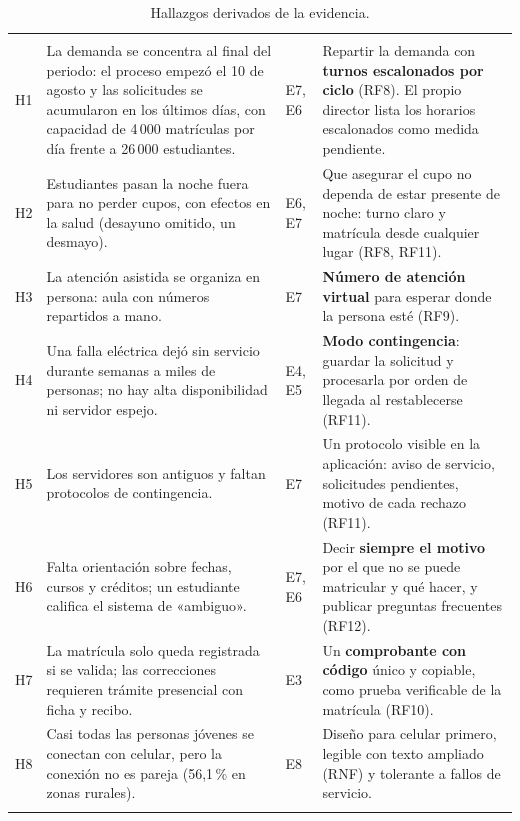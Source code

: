 \begin{longtable}{|p{0.8cm}|p{6.0cm}|p{1.4cm}|p{5.6cm}|}
	\hline
	\cab\hd{ID} & \hd{Hallazgo} & \hd{Evidencia} & \hd{Implicancia para MatrLab}\\
	\hline\endfirsthead
	\hline
	\cab\hd{ID} & \hd{Hallazgo} & \hd{Evidencia} & \hd{Implicancia para MatrLab}\\
	\hline\endhead
	H1 & La demanda se concentra al final del periodo: el proceso empezó el 10 de agosto y las solicitudes se acumularon en los últimos días, con capacidad de 4\,000 matrículas por día frente a 26\,000 estudiantes. & E7, E6 & Repartir la demanda con \textbf{turnos escalonados por ciclo} (RF8). El propio director lista los horarios escalonados como medida pendiente. \\\hline
	H2 & Estudiantes pasan la noche fuera para no perder cupos, con efectos en la salud (desayuno omitido, un desmayo). & E6, E7 & Que asegurar el cupo no dependa de estar presente de noche: turno claro y matrícula desde cualquier lugar (RF8, RF11). \\\hline
	H3 & La atención asistida se organiza en persona: aula con números repartidos a mano. & E7 & \textbf{Número de atención virtual} para esperar donde la persona esté (RF9). \\\hline
	H4 & Una falla eléctrica dejó sin servicio durante semanas a miles de personas; no hay alta disponibilidad ni servidor espejo. & E4, E5 & \textbf{Modo contingencia}: guardar la solicitud y procesarla por orden de llegada al restablecerse (RF11). \\\hline
	H5 & Los servidores son antiguos y faltan protocolos de contingencia. & E7 & Un protocolo visible en la aplicación: aviso de servicio, solicitudes pendientes, motivo de cada rechazo (RF11). \\\hline
	H6 & Falta orientación sobre fechas, cursos y créditos; un estudiante califica el sistema de «ambiguo». & E7, E6 & Decir \textbf{siempre el motivo} por el que no se puede matricular y qué hacer, y publicar preguntas frecuentes (RF12). \\\hline
	H7 & La matrícula solo queda registrada si se valida; las correcciones requieren trámite presencial con ficha y recibo. & E3 & Un \textbf{comprobante con código} único y copiable, como prueba verificable de la matrícula (RF10). \\\hline
	H8 & Casi todas las personas jóvenes se conectan con celular, pero la conexión no es pareja (56,1\,\% en zonas rurales). & E8 & Diseño para celular primero, legible con texto ampliado (RNF) y tolerante a fallos de servicio. \\\hline
	\caption{Hallazgos derivados de la evidencia.}
	\label{tab:hallazgos}
\end{longtable}

